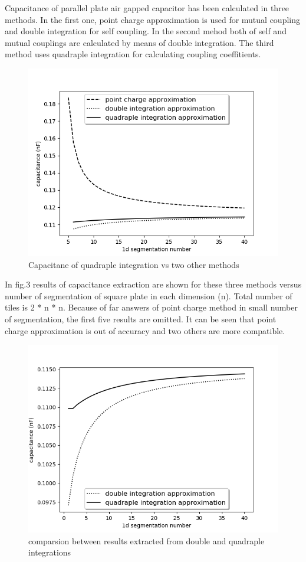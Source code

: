 \documentclass[twoside,twocolumn]{article}
\begin{document}
Capacitance of parallel plate air gapped capacitor has been calculated in three methods. In the first one, point charge approximation is used for mutual coupling and double integration for self coupling. In the second mehod both of self and mutual couplings are calculated by means of double integration. The third method uses quadraple integration for calculating coupling coeffitients. 
\begin {figure}[h]
	\center
	\includegraphics[width=\linewidth]	{saeedvshitoshiandzho.png}
	\caption{Capacitane of quadraple integration vs two other methods}
\end{figure}

In fig.3 results of capacitance extraction are shown for these three methods versus number of segmentation of square plate in each dimension (n). Total number of tiles is 2 * n * n. Because of far answers of point charge method in small number of segmentation, the first five results are omitted. It can be seen that point charge approximation is out of accuracy and two others are more compatible. 
\begin {figure}[h]
	\center
	\includegraphics[width=\linewidth]	{saeedvshitoshi.png}
	\caption{comparsion between results extracted from double and quadraple integrations}
\end{figure}
\end{document}
